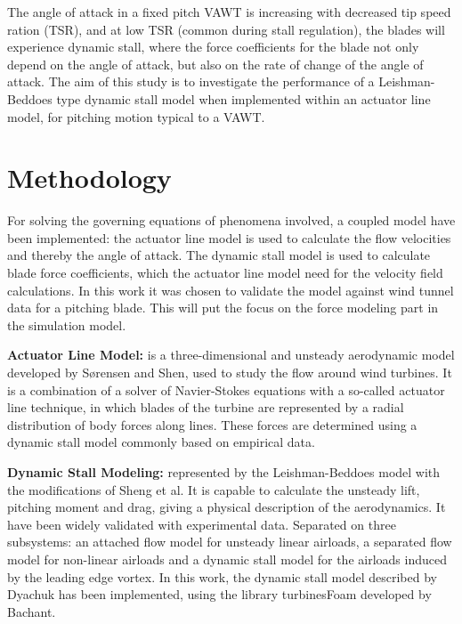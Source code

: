 \documentclass[a4paper]{jpconf}
\begin{document}
The angle of attack in a fixed pitch VAWT is increasing with decreased tip speed
ration (TSR), and at low TSR (common during stall regulation), the blades will
experience dynamic stall, where the force coefficients for the blade not only
depend on the angle of attack, but also on the rate of change of the angle of
attack. The aim of this study is to investigate the performance of a
Leishman-Beddoes type dynamic stall model when implemented within an actuator
line model, for pitching motion typical to a VAWT.


\section{Methodology}

For solving the governing equations of phenomena involved, a coupled model have
been implemented: the actuator line model is used to calculate the flow
velocities and thereby the angle of attack. The dynamic stall model is used to
calculate blade force coefficients, which the actuator line model need for the
velocity field calculations. In this work it was chosen to validate the model
against wind tunnel data for a pitching blade. This will put the focus on the
force modeling part in the simulation model.

\textbf{Actuator Line Model:} is a three-dimensional and unsteady aerodynamic
model developed by S{\o}rensen and Shen\cite{sorensen1999computation}, used to
study the flow around wind turbines. It is a combination of a solver of
Navier-Stokes equations with a so-called actuator line technique, in which
blades of the turbine are represented by a radial distribution of body forces
along lines. These forces are determined using a dynamic stall model commonly
based on empirical data.

\textbf{Dynamic Stall Modeling:} represented by the Leishman-Beddoes
model\cite{leishman1986generalised} with the modifications of Sheng et
al\cite{sheng2008modified}. It is capable to calculate the unsteady lift,
pitching moment and drag, giving a physical description of the aerodynamics. It
have been widely validated with experimental data\cite{leishman1989semi}.
Separated on three subsystems: an attached flow model for unsteady linear
airloads, a separated flow model for non-linear airloads and a dynamic stall
model for the airloads induced by the leading edge vortex. In this work, the
dynamic stall model described by Dyachuk\cite{dyachuk} has been implemented,
using the library turbinesFoam developed by Bachant\cite{bachant2015simulating}.
\end{document}

